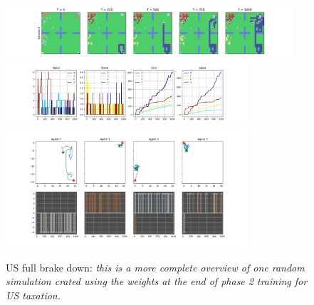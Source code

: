 \begin{figure}[h!]
    \centering
    \linespread{.9}
    \includegraphics[width=0.95\textwidth]{Resources/imgs/Figure_1_Us.png}
    \includegraphics[width=0.80\textwidth]{Resources/imgs/Figure_2_Us.png}
    \includegraphics[width=0.80\textwidth]{Resources/imgs/Figure_3_Us.png}
    \caption[US full brake down: ]%
    {\label{img:p0_brakedown}US full brake down: \small \textit{this is a more complete overview of one random simulation crated using the weights at the end of phase 2 training for US taxation.}}
\end{figure}

